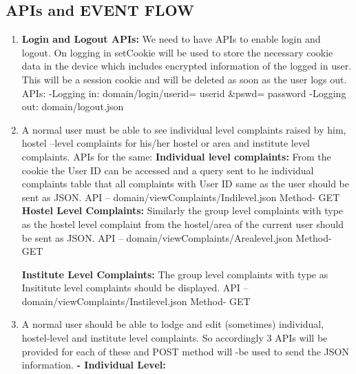 \documentclass{article}
\begin{document}
\begin{itemize}
\section{APIs and EVENT FLOW}
\begin{enumerate}
\item \textbf{Login and Logout APIs:} We need to have APIs to enable login and logout. On logging in setCookie will be used to store the necessary cookie data in the device which includes encrypted information of the logged in user. This will be a session cookie and will be deleted as soon as the user logs out.
APIs:
\newline
-Logging in: domain/login/userid= userid &pswd= password 
\newline
-Logging out: domain/logout.json
\item A normal user must be able to see individual level complaints raised by him, hostel –level complaints for his/her hostel or area and institute level complaints.
\newline
APIs for the same:
\newline
\newline
\textbf{Individual level complaints: }From the cookie the User ID can be accessed and a query sent to he individual complaints table that all complaints with User ID same as the user should be sent as JSON.
\newline
API – domain/viewComplaints/Indilevel.json
\newline
Method- GET
\newline
\newline
\textbf{Hostel Level Complaints:} Similarly the group level complaints with type as the hostel level complaint from the hostel/area of the current user should be sent as JSON.
\newline
API – domain/viewComplaints/Arealevel.json
\newline
Method- GET
\newline

\textbf{Institute Level Complaints:} The group level complaints with type as Insititute level complaints should be displayed.
\newline
API – domain/viewComplaints/Instilevel.json
\newline
Method- GET

\item A normal user should be able to lodge and edit (sometimes) individual, hostel-level and institute level complaints. So accordingly 3 APIs will be provided for each of these and POST method will -be used to send the JSON information.
\newline
\textbf{-	Individual Level: }


\end{enumerate}
\end{itemize}
\end{document}
